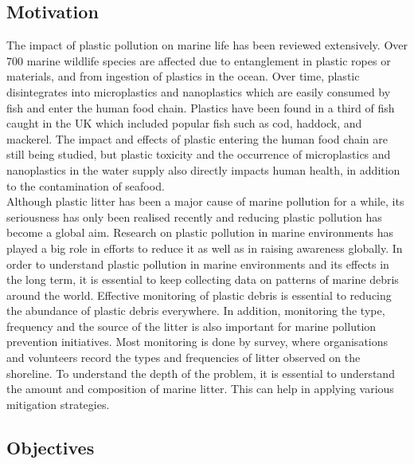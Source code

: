 \documentclass[10pt]{article}\usepackage[]{graphicx}\usepackage[]{color}
\begin{document}
\subsection{Motivation}\label{mot}

The impact of plastic pollution on marine life has been reviewed extensively. \cite{GALL2015} \cite{KUHN2015} \cite{RYAN2015} \cite{WILLIAMS2019} Over 700 marine wildlife species are affected due to entanglement in plastic ropes or materials, and from ingestion of plastics in the ocean.\cite{GALL2015} Over time, plastic disintegrates into microplastics and nanoplastics which are easily consumed by fish and enter the human food chain. Plastics have been found in a third of fish caught in the UK which included popular fish such as cod, haddock, and mackerel.\cite{LUSHER2013} The impact and effects of plastic entering the human food chain are still being studied, but plastic toxicity and the occurrence of microplastics and nanoplastics in the water supply also directly impacts human health, in addition to the contamination of seafood.\cite{ROCHMAN2015} \cite{MARKIC2020} \\

Although plastic litter has been a major cause of marine pollution for a while, its seriousness has only been realised recently and reducing plastic pollution has become a global aim. Research on plastic pollution in marine environments has played a big role in efforts to reduce it as well as in raising awareness globally. In order to understand plastic pollution in marine environments and its effects in the long term, it is essential to keep collecting data on patterns of marine debris around the world. Effective monitoring of plastic debris is essential to reducing the abundance of plastic debris everywhere. In addition, monitoring the type, frequency and the source of the litter is also important for marine pollution prevention initiatives. Most monitoring is done by survey, where organisations and volunteers record the types and frequencies of litter observed on the shoreline.\cite{COE1997} To understand the depth of the problem, it is essential to understand the amount and composition of marine litter. This can help in applying various mitigation strategies.\\

\subsection{Objectives }\label{obj}
\end{document}
